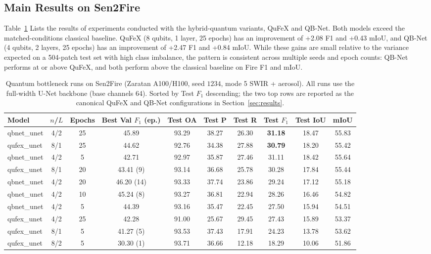 \documentclass{article}
\begin{document}
\subsection{Main Results on Sen2Fire}

Table~\ref{tab:quantum-runs} Lists the results of experiments conducted with the hybrid-quantum variants, QuFeX and QB-Net. Both models exceed the matched-conditions classical baseline. QuFeX (8 qubits, 1 layer, 25 epochs) has an improvement of +2.08 F1 and +0.43 mIoU, and QB-Net (4 qubits, 2 layers, 25 epochs) has an improvement of +2.47 F1 and +0.84 mIoU. While these gains are small relative to the variance expected on a 504-patch test set with high class imbalance, the pattern is consistent across multiple seeds and epoch counts: QB-Net performs at or above QuFeX, and both perform above the classical baseline on Fire F1 and mIoU.

\begin{table}[H]
    \centering
    \small
    \setlength{\tabcolsep}{4pt}
    \begin{tabular}{lccccccccc}
        \toprule
        Model & $n$/$L$ & Epochs & Best Val $F_1$ (ep.) & Test OA & Test P & Test R & Test $F_1$ & Test IoU & mIoU \\
        \midrule
        qbnet\_unet & 4/2 & 25 & 45.89      & 93.29 & 38.27 & 26.30 & \textbf{31.18} & 18.47 & 55.83 \\
        qufex\_unet & 8/1 & 25 & 44.62      & 92.76 & 34.38 & 27.88 & \textbf{30.79} & 18.20 & 55.42 \\
        qbnet\_unet & 4/2 & 5  & 42.71      & 92.97 & 35.87 & 27.46 & 31.11          & 18.42 & 55.64 \\
        qufex\_unet & 8/1 & 20 & 43.41 (9)  & 93.14 & 36.68 & 25.78 & 30.28          & 17.84 & 55.44 \\
        qbnet\_unet & 4/2 & 20 & 46.20 (14) & 93.33 & 37.74 & 23.86 & 29.24          & 17.12 & 55.18 \\
        qbnet\_unet & 4/2 & 10 & 45.24 (8)  & 93.27 & 36.81 & 22.94 & 28.26          & 16.46 & 54.82 \\
        qbnet\_unet & 4/2 & 5  & 44.39      & 93.16 & 35.47 & 22.45 & 27.50          & 15.94 & 54.51 \\
        qufex\_unet & 4/2 & 25 & 42.28      & 91.00 & 25.67 & 29.45 & 27.43          & 15.89 & 53.37 \\
        qufex\_unet & 8/1 & 5  & 41.27 (5)  & 93.53 & 37.43 & 17.91 & 24.23          & 13.78 & 53.62 \\
        qufex\_unet & 8/2 & 5  & 30.30 (1)  & 93.71 & 36.66 & 12.18 & 18.29          & 10.06 & 51.86 \\
        \bottomrule
    \end{tabular}
    \caption{Quantum bottleneck runs on Sen2Fire (Zaratan A100/H100, seed $1234$, mode 5 SWIR + aerosol). All runs use the full-width U-Net backbone (base channels 64). Sorted by Test $F_1$ descending; the two top rows are reported as the canonical QuFeX and QB-Net configurations in Section~\ref{sec:results}.}
    \label{tab:quantum-runs}
\end{table}
\end{document}
